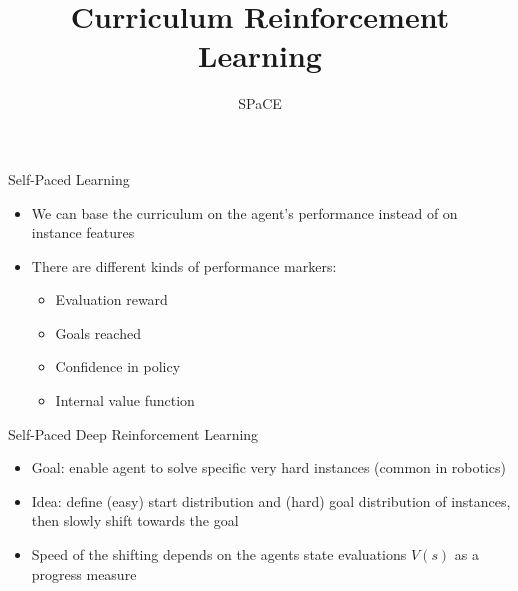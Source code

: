 \documentclass[aspectratio=169]{../latex_main/tntbeamer}  %
\title[Curriculum RL]{Curriculum Reinforcement Learning}
\subtitle{SPaCE}
\begin{document}
	
	\maketitle

\begin{frame}[c]{Self-Paced Learning}
	
	\begin{itemize}
		\item We can base the curriculum on the agent's performance instead of on instance features
		\item There are different kinds of performance markers:
		\pause
		\begin{itemize}
			\item Evaluation reward
			\item Goals reached
			\item Confidence in policy
			\item Internal value function
		\end{itemize}
	\end{itemize}
	
\end{frame}

\begin{frame}[c]{Self-Paced Deep Reinforcement Learning~}
	
	\begin{itemize}
		\item Goal: enable agent to solve specific very hard instances (common in robotics)
		\item Idea: define (easy) start distribution and (hard) goal distribution of instances, then slowly shift towards the goal
		\item Speed of the shifting depends on the agents state evaluations $V(s)$ as a progress measure
	\end{itemize}
	
\end{frame}
\end{document}
